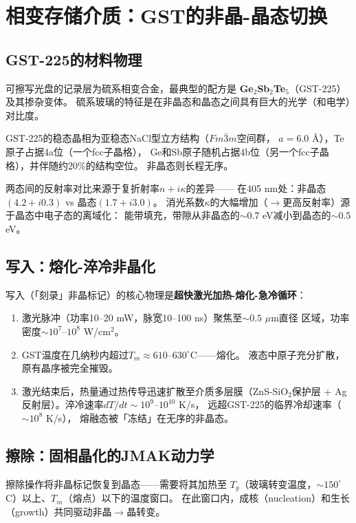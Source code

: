 \documentclass[11pt,a4paper,openany]{book}
\theoremstyle{definition}
\theoremstyle{plain}
\theoremstyle{remark}
\begin{document}
\section{相变存储介质：GST的非晶-晶态切换}

\subsection{GST-225的材料物理}

可擦写光盘的记录层为硫系相变合金，最典型的配方是
\textbf{Ge$_2$Sb$_2$Te$_5$}（GST-225）及其掺杂变体。
硫系玻璃的特征是在非晶态和晶态之间具有巨大的光学（和电学）对比度。

GST-225的稳态晶相为亚稳态NaCl型立方结构（$Fm\bar{3}m$空间群，
$a = 6.0$ \AA），Te原子占据4a位（一个fcc子晶格），
Ge和Sb原子随机占据4b位（另一个fcc子晶格），并伴随约20\%的结构空位。
非晶态则长程无序。

两态间的反射率对比来源于复折射率$n + i\kappa$的差异——
在405 nm处：非晶态$(4.2 + i0.3)$ vs 晶态$(1.7 + i3.0)$。
消光系数$\kappa$的大幅增加（$\to$更高反射率）源于晶态中电子态的离域化：
能带填充，带隙从非晶态的$\sim 0.7$ eV减小到晶态的$\sim 0.5$ eV。

\subsection{写入：熔化-淬冷非晶化}

写入（「刻录」非晶标记）的核心物理是\textbf{超快激光加热-熔化-急冷循环}：
\begin{enumerate}
  \item 激光脉冲（功率10--20 mW，脉宽10--100 ns）聚焦至$\sim 0.5$ $\mu$m直径
  区域，功率密度$\sim 10^7$--$10^8$ W/cm$^2$。
  \item GST温度在几纳秒内超过$T_m \approx 610$--$630^\circ$C——熔化。
  液态中原子充分扩散，原有晶序被完全摧毁。
  \item 激光结束后，热量通过热传导迅速扩散至介质多层膜（ZnS-SiO$_2$保护层 +
  Ag反射层）。淬冷速率$dT/dt \sim 10^9$--$10^{10}$ K/s，
  远超GST-225的临界冷却速率（$\sim 10^8$ K/s），
  熔融态被「冻结」在无序的非晶态。
\end{enumerate}

\subsection{擦除：固相晶化的JMAK动力学}

擦除操作将非晶标记恢复到晶态——需要将其加热至
$T_g$（玻璃转变温度，$\sim 150^\circ$C）以上、$T_m$（熔点）以下的温度窗口。
在此窗口内，成核（nucleation）和生长（growth）共同驱动非晶$\to$晶转变。
\end{document}
